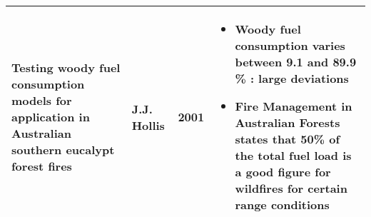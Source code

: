 \documentclass[12pt]{article}
\begin{document}
\begin{center}
\begin{longtable}{|p{4.5cm}|p{2cm}|p{0.8cm}|p{7.5cm}|}
\hline

\raggedright Testing woody fuel consumption models for application in Australian southern eucalypt forest fires & J.J. Hollis & 2001 & \raggedleft 
\begin{itemize} 
\item Woody fuel consumption varies between 9.1 and 89.9 \% : large deviations
\item Fire  Management in Australian Forests states that 50\% of the total fuel load is a good figure for wildfires for certain range conditions
\end{itemize} 
\tabularnewline

\hline




\end{longtable}

\end{center}
\newpage
\end{document}
